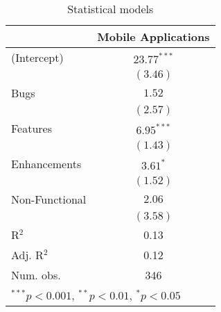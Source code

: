 
\begin{table}
\begin{center}
\begin{tabular}{l c }
\hline
               & Mobile Applications \\
\hline
(Intercept)    & $23.77^{***}$ \\
               & $(3.46)$      \\
Bugs           & $1.52$        \\
               & $(2.57)$      \\
Features       & $6.95^{***}$  \\
               & $(1.43)$      \\
Enhancements   & $3.61^{*}$    \\
               & $(1.52)$      \\
Non-Functional & $2.06$        \\
               & $(3.58)$      \\
\hline
R$^2$          & 0.13          \\
Adj. R$^2$     & 0.12          \\
Num. obs.      & 346           \\
\hline
\multicolumn{2}{l}{\scriptsize{$^{***}p<0.001$, $^{**}p<0.01$, $^*p<0.05$}}
\end{tabular}
\caption{Statistical models}
\label{table:coefficients}
\end{center}
\end{table}

